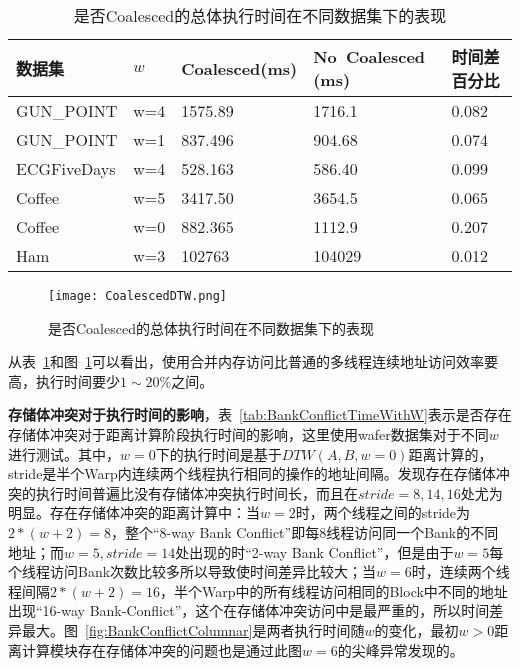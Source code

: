 \begin{table}[htbp]
	\centering
	\begin{minipage}{0.85\textwidth}
		\caption{是否Coalesced的总体执行时间在不同数据集下的表现}
		\label{tab:TimeCoalesced}
		\begin{tabular}{p{3cm}p{1cm}p{2cm}p{2.5cm}p{2cm}}
			\toprule[1.5pt]
			{\heiti 数据集 }& {\heiti $w$ } &{\heiti Coalesced(ms) } &{\heiti No~Coalesced (ms) } &{\heiti 时间差 百分比 }
			\\\midrule[1pt]			
				GUN\_POINT & w=4 & 1575.89 & 1716.1 & 0.082\\
				GUN\_POINT & w=1 & 837.496 & 904.68 & 0.074\\
				ECGFiveDays & w=4 & 528.163 & 586.40 & 0.099\\
				Coffee & w=5 & 3417.50 & 3654.5 & 0.065\\
				Coffee & w=0 & 882.365 & 1112.9 & 0.207\\
				Ham & w=3 & 102763 & 104029 & 0.012\\
			\bottomrule[1.5pt]
		\end{tabular}
	\end{minipage}
\end{table}

\begin{figure}[H] %
	\centering
	\texttt{[image: CoalescedDTW.png]}
	\caption{是否Coalesced的总体执行时间在不同数据集下的表现}
	\label{fig:CoalescedDTW}
\end{figure}

从表~\ref{tab:TimeCoalesced}和图~\ref{fig:CoalescedDTW}可以看出，使用合并内存访问比普通的多线程连续地址访问效率要高，执行时间要少$1\sim 20\%$之间。%

\textbf{存储体冲突对于执行时间的影响}，表~\ref{tab:BankConflictTimeWithW}表示是否存在存储体冲突对于距离计算阶段执行时间的影响，这里使用wafer数据集对于不同$w$进行测试。其中，$w=0$下的执行时间是基于$DTW(A,B,w=0)$距离计算的，stride是半个Warp内连续两个线程执行相同的操作的地址间隔。发现存在存储体冲突的执行时间普遍比没有存储体冲突执行时间长，而且在$stride=8,14,16$处尤为明显。存在存储体冲突的距离计算中：当$w=2$时，两个线程之间的stride为$2*(w+2)=8$，整个“8-way Bank Conflict”即每8线程访问同一个Bank的不同地址；而$w=5,stride=14$处出现的时“2-way Bank Conflict”，但是由于$w=5$每个线程访问Bank次数比较多所以导致使时间差异比较大；当$w=6$时，连续两个线程间隔$2*(w+2)=16$，半个Warp中的所有线程访问相同的Block中不同的地址出现“16-way Bank-Conflict”，这个在存储体冲突访问中是最严重的，所以时间差异最大。图~\ref{fig:BankConflictColumnar}是两者执行时间随$w$的变化，最初$w>0$距离计算模块存在存储体冲突的问题也是通过此图$w=6$的尖峰异常发现的。

